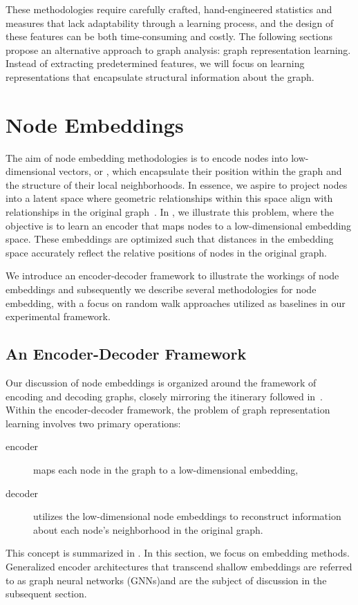 These methodologies require carefully crafted, hand-engineered statistics and measures that lack adaptability through a learning process, and the design of these features can be both time-consuming and costly. The following sections propose an alternative approach to graph analysis: graph representation learning. Instead of extracting predetermined features, we will focus on learning representations that encapsulate structural information about the graph.

\section{Node Embeddings}\label{sec:shallowEmbeddings}
The aim of node embedding methodologies is to encode nodes into low-dimensional vectors, or , which encapsulate their position within the graph and the structure of their local neighborhoods. In essence, we aspire to project nodes into a latent space where geometric relationships within this space align with relationships in the original graph~\cite{Hoff2002latentSpaceApproachesSocialNetworkAnalysis}. In , we illustrate this problem, where the objective is to learn an encoder that maps nodes to a low-dimensional embedding space. These embeddings are optimized such that distances in the embedding space accurately reflect the relative positions of nodes in the original graph.


We introduce an encoder-decoder framework to illustrate the workings of node embeddings and subsequently we describe several methodologies for node embedding, with a focus on random walk approaches utilized as baselines in our experimental framework.

\subsection{An Encoder-Decoder Framework}
Our discussion of node embeddings is organized around the framework of encoding and decoding graphs, closely mirroring the itinerary followed in~\cite{Hamilton2020GraphRL}. Within the encoder-decoder framework, the problem of graph representation learning involves two primary operations:
\begin{description}
    \item[encoder] maps each node in the graph to a low-dimensional embedding,
    \item[decoder] utilizes the low-dimensional node embeddings to reconstruct information about each node's neighborhood in the original graph.
\end{description}
This concept is summarized in . In this section, we focus on  embedding methods. Generalized encoder architectures that transcend shallow embeddings are referred to as graph neural networks (GNNs)and are the subject of discussion in the subsequent section.

